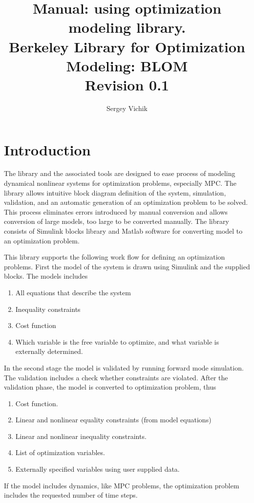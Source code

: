 \documentclass {article}
\begin{document}
\title{ Manual: using optimization modeling library. \\
Berkeley Library for Optimization Modeling:  BLOM\\
Revision 0.1 }
\author{Sergey Vichik}

\maketitle


\section{Introduction}

The library and the associated tools are designed to ease process of modeling
dynamical nonlinear systems for optimization problems, especially MPC. 
The library allows intuitive block diagram definition of the system,
simulation, validation, and an automatic generation of an optimization problem
to be solved. This process eliminates errors introduced by manual conversion
and allows conversion of large models, too large to be converted manually. 
The library consists of Simulink blocks library and Matlab software for
converting model to an optimization problem. 

This library supports the following work flow for defining an optimization problems. 
First the model of the system is drawn using Simulink and the supplied blocks. 
The models includes 
\begin{enumerate}
\item 
All equations that describe the system
\item Inequality constraints 
\item Cost function
\item Which variable is the free variable to optimize, and what variable is externally determined.
\end{enumerate}
In the second stage the model is validated by running forward mode
simulation. The validation includes a check whether constraints are violated. 
After the validation phase, the model is converted to optimization problem, thus
\begin{enumerate}
\item Cost function.
\item Linear and nonlinear equality constraints (from model equations)
\item Linear and nonlinear inequality constraints.
\item List of optimization variables.
\item Externally specified variables using user supplied data.
\end{enumerate}
If the model includes dynamics, like MPC problems, the optimization problem
includes the requested number of time steps. 
\end{document}
